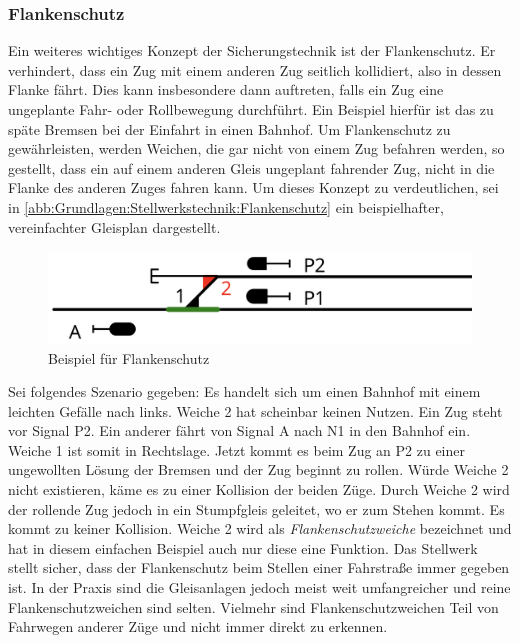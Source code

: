\subsubsection*{Flankenschutz}\label{text:Grundlagen:Stellwerkstechnik:Sicherung-des-Schienenverkehrs:Flankenschutz}

Ein weiteres wichtiges Konzept der Sicherungstechnik ist der Flankenschutz. Er verhindert, dass ein Zug mit einem anderen Zug seitlich kollidiert, also in dessen Flanke fährt. Dies kann insbesondere dann auftreten, falls ein Zug eine ungeplante Fahr- oder Rollbewegung durchführt. Ein Beispiel hierfür ist das zu späte Bremsen bei der Einfahrt in einen Bahnhof. Um Flankenschutz zu gewährleisten, werden Weichen, die gar nicht von einem Zug befahren werden, so gestellt, dass ein auf einem anderen Gleis ungeplant fahrender Zug, nicht in die Flanke des anderen Zuges fahren kann. Um dieses Konzept zu verdeutlichen, sei in \autoref{abb:Grundlagen:Stellwerkstechnik:Flankenschutz} ein beispielhafter, vereinfachter Gleisplan dargestellt.

\begin{figure}[H]
    \centering
    \includegraphics[width=\textwidth]{Assets/Images/2-Grundlagen/Flankenschutz.png}
    \caption{Beispiel für Flankenschutz}\label{abb:Grundlagen:Stellwerkstechnik:Flankenschutz}
\end{figure}

Sei folgendes Szenario gegeben: Es handelt sich um einen Bahnhof mit einem leichten Gefälle nach links. Weiche 2 hat scheinbar keinen Nutzen. Ein Zug steht vor Signal P2. Ein anderer fährt von Signal A nach N1 in den Bahnhof ein. Weiche 1 ist somit in Rechtslage. Jetzt kommt es beim Zug an P2 zu einer ungewollten Lösung der Bremsen und der Zug beginnt zu rollen. Würde Weiche 2 nicht existieren, käme es zu einer Kollision der beiden Züge. Durch Weiche 2 wird der rollende Zug jedoch in ein Stumpfgleis geleitet, wo er zum Stehen kommt. Es kommt zu keiner Kollision. Weiche 2 wird als \textit{Flankenschutzweiche} bezeichnet und hat in diesem einfachen Beispiel auch nur diese eine Funktion. Das Stellwerk stellt sicher, dass der Flankenschutz beim Stellen einer Fahrstraße immer gegeben ist. In der Praxis sind die Gleisanlagen jedoch meist weit umfangreicher und reine Flankenschutzweichen sind selten. Vielmehr sind Flankenschutzweichen Teil von Fahrwegen anderer Züge und nicht immer direkt zu erkennen.

